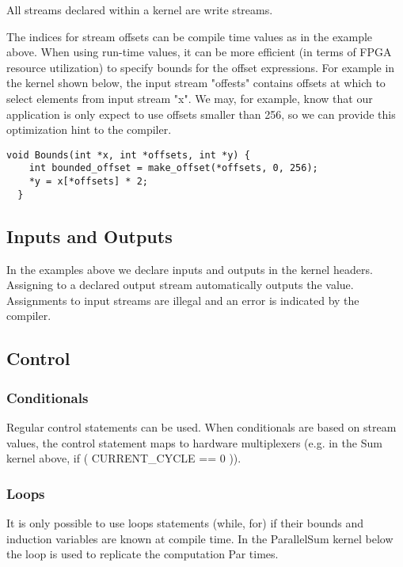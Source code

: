 All streams declared within a kernel are write streams.

The indices for stream offsets can be compile time values as in the
example above. When using run-time values, it can be more efficient
(in terms of FPGA resource utilization) to specify bounds for the
offset expressions. For example in the kernel shown below, the input
stream "offests" contains offsets at which to select elements from
input stream "x". We may, for example, know that our application is
only expect to use offsets smaller than 256, so we can provide this
optimization hint to the compiler.

\begin{lstlisting}[caption={\FAST{} kernel using offsets.}]
  void Bounds(int *x, int *offsets, int *y) {
    int bounded_offset = make_offset(*offsets, 0, 256);
    *y = x[*offsets] * 2;
  }
\end{lstlisting}

\subsection{Inputs and Outputs}

In the examples above we declare inputs and outputs in the kernel
headers. Assigning to a declared output stream automatically outputs
the value. Assignments to input streams are illegal and an error is
indicated by the compiler.

\subsection{Control}

\subsubsection*{Conditionals}

Regular control statements can be used. When conditionals are based on
stream values, the control statement maps to hardware multiplexers
(e.g. in the Sum kernel above, if ( CURRENT\_CYCLE == 0 )).

\subsubsection*{Loops}

It is only possible to use loops statements (while, for) if their
bounds and induction variables are known at compile time. In the
ParallelSum kernel below the loop is used to replicate the computation
Par times.

